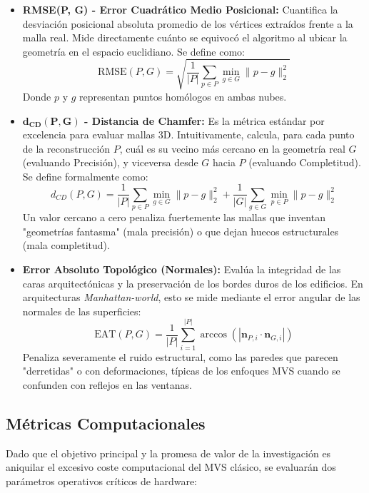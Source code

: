 \begin{itemize}
    \item \textbf{RMSE(P, G) - Error Cuadrático Medio Posicional:} Cuantifica la desviación posicional absoluta promedio de los vértices extraídos frente a la malla real. Mide directamente cuánto se equivocó el algoritmo al ubicar la geometría en el espacio euclidiano. Se define como:
    \begin{equation}
        \text{RMSE}(P, G) = \sqrt{\frac{1}{|P|} \sum_{p \in P} \min_{g \in G} \|p - g\|_2^2}
    \end{equation}
    Donde $p$ y $g$ representan puntos homólogos en ambas nubes.

    \item \textbf{$\mathbf{d_{CD}(P, G)}$ - Distancia de Chamfer:} Es la métrica estándar por excelencia para evaluar mallas 3D. Intuitivamente, calcula, para cada punto de la reconstrucción $P$, cuál es su vecino más cercano en la geometría real $G$ (evaluando Precisión), y viceversa desde $G$ hacia $P$ (evaluando Completitud). Se define formalmente como:
    \begin{equation}
        d_{CD}(P, G) = \frac{1}{|P|} \sum_{p \in P} \min_{g \in G} \|p - g\|_2^2 + \frac{1}{|G|} \sum_{g \in G} \min_{p \in P} \|p - g\|_2^2
    \end{equation}
    Un valor cercano a cero penaliza fuertemente las mallas que inventan "geometrías fantasma" (mala precisión) o que dejan huecos estructurales (mala completitud).

    \item \textbf{Error Absoluto Topológico (Normales):} Evalúa la integridad de las caras arquitectónicas y la preservación de los bordes duros de los edificios. En arquitecturas \textit{Manhattan-world}, esto se mide mediante el error angular de las normales de las superficies:
    \begin{equation}
        \text{EAT}(P, G) = \frac{1}{|P|} \sum_{i=1}^{|P|} \arccos(|\mathbf{n}_{P,i} \cdot \mathbf{n}_{G,i}|)
    \end{equation}
    Penaliza severamente el ruido estructural, como las paredes que parecen "derretidas" o con deformaciones, típicas de los enfoques MVS cuando se confunden con reflejos en las ventanas.
\end{itemize}

\subsection{Métricas Computacionales}
Dado que el objetivo principal y la promesa de valor de la investigación es aniquilar el excesivo coste computacional del MVS clásico, se evaluarán dos parámetros operativos críticos de hardware:

